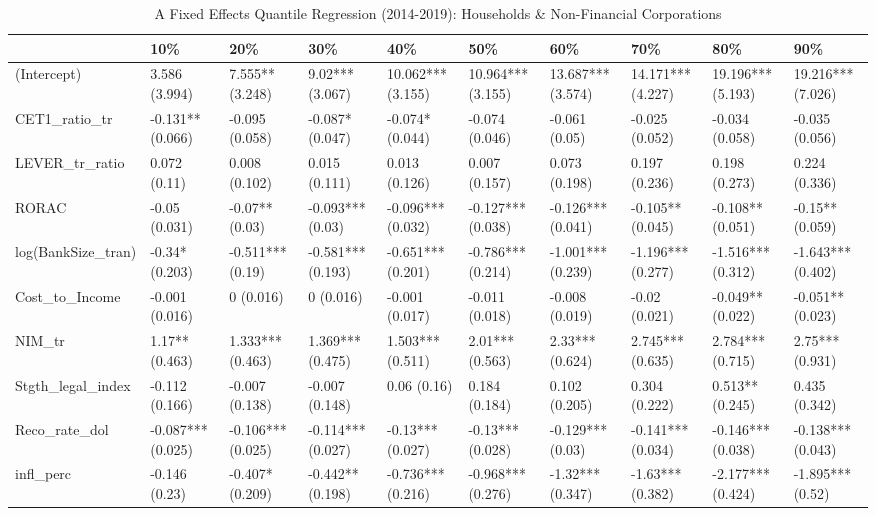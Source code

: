 \begin{table}[ht]
\centering
\caption{A Fixed Effects Quantile Regression (2014-2019): Households & Non-Financial Corporations} 
\begingroup\small
\begin{tabular}{llllllllll}
  \toprule
 & 10\% & 20\% & 30\% & 40\% & 50\% & 60\% & 70\% & 80\% & 90\% \\ 
  \midrule
(Intercept) & 3.586 (3.994) & 7.555** (3.248) & 9.02*** (3.067) & 10.062*** (3.155) & 10.964*** (3.155) & 13.687*** (3.574) & 14.171*** (4.227) & 19.196*** (5.193) & 19.216*** (7.026) \\ 
  CET1\_ratio\_tr & -0.131** (0.066) & -0.095 (0.058) & -0.087* (0.047) & -0.074* (0.044) & -0.074 (0.046) & -0.061 (0.05) & -0.025 (0.052) & -0.034 (0.058) & -0.035 (0.056) \\ 
  LEVER\_tr\_ratio & 0.072 (0.11) & 0.008 (0.102) & 0.015 (0.111) & 0.013 (0.126) & 0.007 (0.157) & 0.073 (0.198) & 0.197 (0.236) & 0.198 (0.273) & 0.224 (0.336) \\ 
  RORAC & -0.05 (0.031) & -0.07** (0.03) & -0.093*** (0.03) & -0.096*** (0.032) & -0.127*** (0.038) & -0.126*** (0.041) & -0.105** (0.045) & -0.108** (0.051) & -0.15** (0.059) \\ 
  log(BankSize\_tran) & -0.34* (0.203) & -0.511*** (0.19) & -0.581*** (0.193) & -0.651*** (0.201) & -0.786*** (0.214) & -1.001*** (0.239) & -1.196*** (0.277) & -1.516*** (0.312) & -1.643*** (0.402) \\ 
  Cost\_to\_Income & -0.001 (0.016) & 0 (0.016) & 0 (0.016) & -0.001 (0.017) & -0.011 (0.018) & -0.008 (0.019) & -0.02 (0.021) & -0.049** (0.022) & -0.051** (0.023) \\ 
  NIM\_tr & 1.17** (0.463) & 1.333*** (0.463) & 1.369*** (0.475) & 1.503*** (0.511) & 2.01*** (0.563) & 2.33*** (0.624) & 2.745*** (0.635) & 2.784*** (0.715) & 2.75*** (0.931) \\ 
  Stgth\_legal\_index & -0.112 (0.166) & -0.007 (0.138) & -0.007 (0.148) & 0.06 (0.16) & 0.184 (0.184) & 0.102 (0.205) & 0.304 (0.222) & 0.513** (0.245) & 0.435 (0.342) \\ 
  Reco\_rate\_dol & -0.087*** (0.025) & -0.106*** (0.025) & -0.114*** (0.027) & -0.13*** (0.027) & -0.13*** (0.028) & -0.129*** (0.03) & -0.141*** (0.034) & -0.146*** (0.038) & -0.138*** (0.043) \\ 
  infl\_perc & -0.146 (0.23) & -0.407* (0.209) & -0.442** (0.198) & -0.736*** (0.216) & -0.968*** (0.276) & -1.32*** (0.347) & -1.63*** (0.382) & -2.177*** (0.424) & -1.895*** (0.52) \\ 

\end{tabular}
\end{table}
